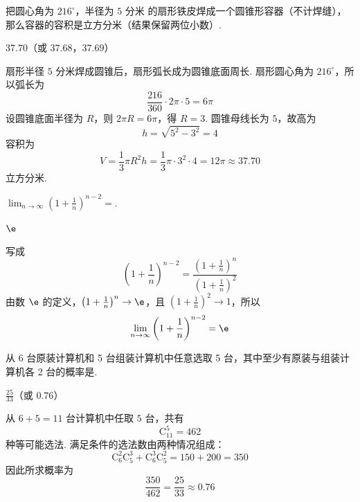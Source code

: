 \documentclass[UTF8,a4paper,oneside,11pt]{ctexbook}
\begin{document}
\begin{problem}[A]
把圆心角为 \(216^\circ\)，半径为 \(5\text{ 分米}\) 的扇形铁皮焊成一个圆锥形容器（不计焊缝），那么容器的容积是\fillinblank{}\(\text{立方分米}\)（结果保留两位小数）.
\end{problem}

\begin{answer}
\(37.70\)（或 \(37.68\)，\(37.69\)）
\end{answer}

\begin{solution}
扇形半径 \(5\) 分米焊成圆锥后，扇形弧长成为圆锥底面周长. 扇形圆心角为 \(216^\circ\)，所以弧长为
\[
\frac{216}{360}\cdot2\pi\cdot5=6\pi
\]
设圆锥底面半径为 \(R\)，则 \(2\pi R=6\pi\)，得 \(R=3\). 圆锥母线长为 \(5\)，故高为
\[
h=\sqrt{5^2-3^2}=4
\]
容积为
\[
V=\frac13\pi R^2h=\frac13\pi\cdot3^2\cdot4=12\pi\approx37.70
\]
立方分米.
\end{solution}

\setcounter{probnum}{17}
\begin{problem}[B]
\(\displaystyle\lim_{n\to\infty}\left(1+\frac{1}{n}\right)^{n-2}=\)\fillinblank{}.
\end{problem}

\begin{answer}
\(\e\)
\end{answer}

\begin{solution}
写成
\[
\left(1+\frac1n\right)^{n-2}
=\frac{\left(1+\frac1n\right)^n}{\left(1+\frac1n\right)^2}
\]
由数 \(\e\) 的定义，\(\left(1+\frac1n\right)^n\to\e\)，且 \(\left(1+\frac1n\right)^2\to1\)，所以
\[
\lim_{n\to\infty}\left(1+\frac1n\right)^{n-2}=\e
\]
\end{solution}

\begin{problem}[B]
从 6 台原装计算机和 5 台组装计算机中任意选取 5 台，其中至少有原装与组装计算机各 2 台的概率是\fillinblank{}.
\end{problem}

\begin{answer}
\(\frac{25}{33}\)（或 \(0.76\)）
\end{answer}

\begin{solution}
从 \(6+5=11\) 台计算机中任取 \(5\) 台，共有
\[
\mathrm C_{11}^5=462
\]
种等可能选法. 满足条件的选法数由两种情况组成：
\[
\mathrm C_6^2\mathrm C_5^3+\mathrm C_6^3\mathrm C_5^2
=150+200=350
\]
因此所求概率为
\[
\frac{350}{462}=\frac{25}{33}\approx0.76
\]
\end{solution}
\end{document}
